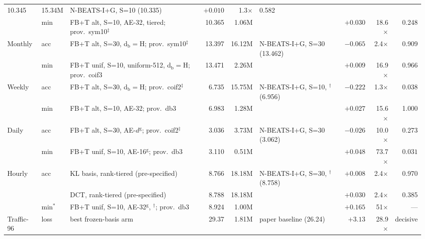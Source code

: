 \begin{table}[t]
\begin{tabular}{llp{4.35cm}rrlrrr}
    10.345 & 15.34M & N-BEATS-I+G, S=10 (10.335) &
    $+0.010$ & 1.3$\times$ & 0.582 \\
            & min & FB+T alt, S=10, AE-32, tiered; prov.\ sym10$^{\ddag}$ &
    10.365 & 1.06M & & $+0.030$ & 18.6$\times$ & 0.248 \\
  \addlinespace[2pt]
  Monthly & acc & FB+T alt, S=30, d$_{\mathrm{b}}{=}$H;
    prov.\ sym10$^{\ddag}$ &
    13.397 & 16.12M & N-BEATS-I+G, S=30 (13.462) &
    $\mathbf{-0.065}$ & 2.4$\times$ & 0.909 \\
          & min & FB+T unif, S=10, uniform-512, d$_{\mathrm{b}}{=}$H;
    prov.\ coif3 &
    13.471 & 2.26M & & $+0.009$ & 16.9$\times$ & 0.966 \\
  \addlinespace[2pt]
  Weekly & acc & FB+T alt, S=30, d$_{\mathrm{b}}{=}$H;
    prov.\ coif2$^{\ddag}$ &
    6.735 & 15.75M & N-BEATS-I+G, S=10, $^{\dag}$ (6.956) &
    $\mathbf{-0.222}$ & 1.3$\times$ & $\mathbf{0.038}$ \\
         & min & FB+T alt, S=10, AE-32; prov.\ db3 &
    6.983 & 1.28M & & $+0.027$ & 15.6$\times$ & 1.000 \\
  \addlinespace[2pt]
  Daily & acc & FB+T alt, S=30, AE-$d$$^{\mathrm{g}}$;
    prov.\ coif2$^{\ddag}$ &
    3.036 & 3.73M & N-BEATS-I+G, S=30 (3.062) &
    $\mathbf{-0.026}$ & 10.0$\times$ & 0.273 \\
        & min & FB+T unif, S=10, AE-16$^{\mathrm{g}}$; prov.\ db3 &
    3.110 & 0.51M & & $+0.048$ & 73.7$\times$ & $\mathbf{0.031}$ \\
  \addlinespace[2pt]
  Hourly & acc & KL basis, rank-tiered (pre-specified) &
    8.766 & 18.18M & N-BEATS-I+G, S=30, $^{\dag}$ (8.758) &
    $+0.008$ & 2.4$\times$ & 0.970 \\
         &     & DCT, rank-tiered (pre-specified) &
    8.788 & 18.18M & & $+0.030$ & 2.4$\times$ & 0.385 \\
         & min$^{\ast}$ & FB+T unif, S=10, AE-32$^{\mathrm{g}}$,
    $^{\dag}$; prov.\ db3 &
    8.924 & 1.00M & & $+0.165$ & 51$\times$ & --- \\
  \addlinespace[2pt]
  Traffic-96 & loss & best frozen-basis arm &
    29.37 & 1.81M & paper baseline (26.24) &
    $\mathbf{+3.13}$ & 28.9$\times$ & decisive \\
  \bottomrule
\end{tabular}
\end{table}
